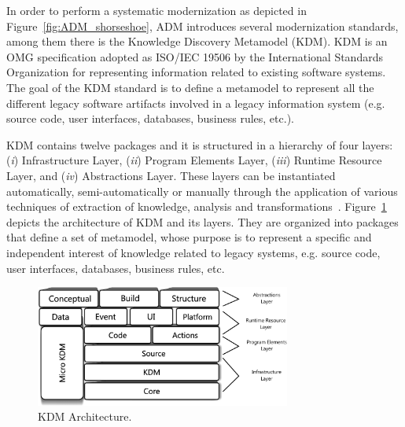 In order to perform a systematic modernization as depicted in Figure~\ref{fig:ADM_shorseshoe}, ADM introduces several modernization standards, among them there is the Knowledge Discovery Metamodel (KDM).
KDM is an OMG specification adopted as ISO/IEC 19506 by the International Standards Organization for representing information related to existing software systems. 
The goal of the KDM standard is to define a metamodel to represent all the different legacy software artifacts involved in a legacy information system (e.g. source code, user interfaces, databases, business rules, etc.). %

KDM contains twelve packages and it is structured in a hierarchy of four layers: (\textit{i}) Infrastructure Layer, (\textit{ii}) Program Elements Layer, (\textit{iii}) Runtime Resource Layer, and (\textit{iv}) Abstractions Layer. These layers can be instantiated automatically, semi-automatically or manually through the application of various techniques of extraction of knowledge, analysis and transformations~\cite{1686216}. Figure~\ref{fig:kdmLayers} depicts the architecture of KDM and its layers. %
They are organized into packages that define a set of metamodel, whose purpose is to represent a specific and independent interest of knowledge related to legacy systems, e.g. source code, user interfaces, databases, business rules, etc.

\begin{figure}[!ht]
\centering
 \includegraphics[width=3.3in]{figuras/camadas_kdm}
\caption{KDM Architecture.}
\label{fig:kdmLayers}
\end{figure}

